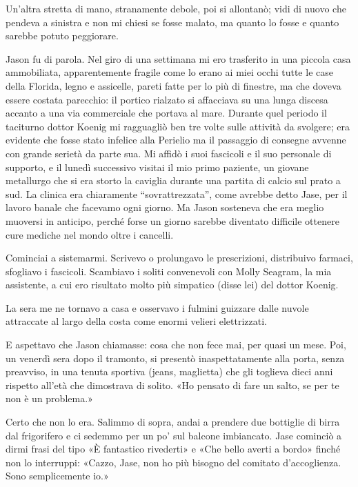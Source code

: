 Un'altra stretta di mano, stranamente debole, poi si allontanò; vidi di
nuovo che pendeva a sinistra e non mi chiesi se fosse malato, ma quanto
lo fosse e quanto sarebbe potuto peggiorare.

\separatorefiori

Jason fu di parola. Nel giro di una settimana mi ero trasferito in una
piccola casa ammobiliata, apparentemente fragile come lo erano ai miei
occhi tutte le case della Florida, legno e assicelle, pareti fatte per
lo più di finestre, ma che doveva essere costata parecchio: il portico
rialzato si affacciava su una lunga discesa accanto a una via
commerciale che portava al mare. Durante quel periodo il taciturno
dottor Koenig mi ragguagliò ben tre volte sulle attività da svolgere;
era evidente che fosse stato infelice alla Perielio ma il passaggio di
consegne avvenne con grande serietà da parte sua. Mi affidò i suoi
fascicoli e il suo personale di supporto, e il lunedì successivo visitai
il mio primo paziente, un giovane metallurgo che si era storto la
caviglia durante una partita di calcio sul prato a sud. La clinica era
chiaramente ``sovrattrezzata'', come avrebbe detto Jase, per il lavoro
banale che facevamo ogni giorno. Ma Jason sosteneva che era meglio
muoversi in anticipo, perché forse un giorno sarebbe diventato difficile
ottenere cure mediche nel mondo oltre i cancelli.

Cominciai a sistemarmi. Scrivevo o prolungavo le prescrizioni,
distribuivo farmaci, sfogliavo i fascicoli. Scambiavo i soliti
convenevoli con Molly Seagram, la mia assistente, a cui ero risultato
molto più simpatico (disse lei) del dottor Koenig.

La sera me ne tornavo a casa e osservavo i fulmini guizzare dalle nuvole
attraccate al largo della costa come enormi velieri elettrizzati.

E aspettavo che Jason chiamasse: cosa che non fece mai, per quasi un
mese. Poi, un venerdì sera dopo il tramonto, si presentò
inaspettatamente alla porta, senza preavviso, in una tenuta sportiva
(jeans, maglietta) che gli toglieva dieci anni rispetto all'età che
dimostrava di solito. «Ho pensato di fare un salto, se per te non è un
problema.»

Certo che non lo era. Salimmo di sopra, andai a prendere due bottiglie
di birra dal frigorifero e ci sedemmo per un po' sul balcone imbiancato.
Jase cominciò a dirmi frasi del tipo «È fantastico rivederti» e «Che
bello averti a bordo» finché non lo interruppi: «Cazzo, Jase, non ho più
bisogno del comitato d'accoglienza. Sono semplicemente io.»

